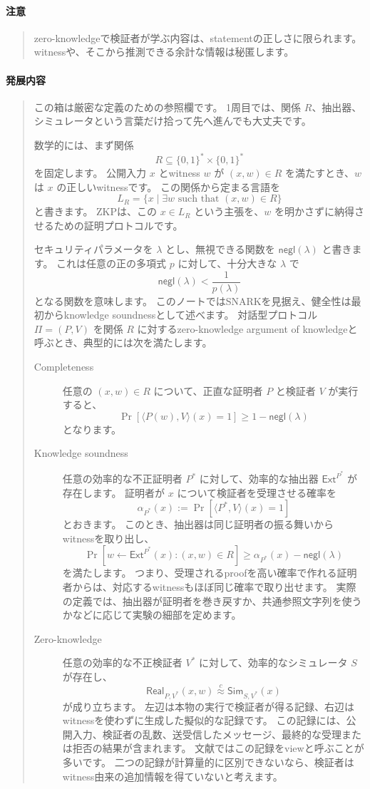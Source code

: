 \documentclass[a4paper,11pt]{ltjsarticle}
\newcommand{\Ext}{\mathsf{Ext}}
\newcommand{\negl}{\mathsf{negl}}
\newenvironment{warnbox}{%
  \paragraph*{注意}\begin{quote}
}{%
  \end{quote}
}
\newenvironment{advancedbox}{%
  \paragraph*{発展内容}\begin{quote}
}{%
  \end{quote}
}
\begin{document}
\begin{warnbox}
zero-knowledgeで検証者が学ぶ内容は、statementの正しさに限られます。
witnessや、そこから推測できる余計な情報は秘匿します。
\end{warnbox}

\begin{advancedbox}
この箱は厳密な定義のための参照欄です。
1周目では、関係 \(R\)、抽出器、シミュレータという言葉だけ拾って先へ進んでも大丈夫です。

数学的には、まず関係
\[
  R \subseteq \{0,1\}^\ast \times \{0,1\}^\ast
\]
を固定します。
公開入力 \(x\) とwitness \(w\) が \((x,w)\in R\) を満たすとき、\(w\) は \(x\) の正しいwitnessです。
この関係から定まる言語を
\[
  L_R=\{x\mid \exists w \text{ such that } (x,w)\in R\}
\]
と書きます。
ZKPは、この \(x\in L_R\) という主張を、\(w\) を明かさずに納得させるための証明プロトコルです。

セキュリティパラメータを \(\lambda\) とし、無視できる関数を \(\negl(\lambda)\) と書きます。
これは任意の正の多項式 \(p\) に対して、十分大きな \(\lambda\) で
\[
  \negl(\lambda) < \frac{1}{p(\lambda)}
\]
となる関数を意味します。
このノートではSNARKを見据え、健全性は最初からknowledge soundnessとして述べます。
対話型プロトコル \(\Pi=(P,V)\) を関係 \(R\) に対するzero-knowledge argument of knowledgeと呼ぶとき、典型的には次を満たします。

\begin{description}
  \item[Completeness]
  任意の \((x,w)\in R\) について、正直な証明者 \(P\) と検証者 \(V\) が実行すると、
  \[
    \Pr[\langle P(w),V\rangle(x)=1]\ge 1-\negl(\lambda)
  \]
  となります。

  \item[Knowledge soundness]
  任意の効率的な不正証明者 \(P^\ast\) に対して、効率的な抽出器 \(\Ext^{P^\ast}\) が存在します。
  証明者が \(x\) について検証者を受理させる確率を
  \[
    \alpha_{P^\ast}(x)
    :=
    \Pr[\langle P^\ast,V\rangle(x)=1]
  \]
  とおきます。
  このとき、抽出器は同じ証明者の振る舞いからwitnessを取り出し、
  \[
    \Pr[
      w\leftarrow \Ext^{P^\ast}(x) : (x,w)\in R
    ]
    \ge
    \alpha_{P^\ast}(x)-\negl(\lambda)
  \]
  を満たします。
  つまり、受理されるproofを高い確率で作れる証明者からは、対応するwitnessもほぼ同じ確率で取り出せます。
  実際の定義では、抽出器が証明者を巻き戻すか、共通参照文字列を使うかなどに応じて実験の細部を定めます。

  \item[Zero-knowledge]
  任意の効率的な不正検証者 \(V^\ast\) に対して、効率的なシミュレータ \(S\) が存在し、
  \[
    \mathsf{Real}_{P,V^\ast}(x,w) \stackrel{c}{\approx}
    \mathsf{Sim}_{S,V^\ast}(x)
  \]
  が成り立ちます。
  左辺は本物の実行で検証者が得る記録、右辺はwitnessを使わずに生成した擬似的な記録です。
  この記録には、公開入力、検証者の乱数、送受信したメッセージ、最終的な受理または拒否の結果が含まれます。
  文献ではこの記録をviewと呼ぶことが多いです。
  二つの記録が計算量的に区別できないなら、検証者はwitness由来の追加情報を得ていないと考えます。
\end{description}


\end{advancedbox}
\end{document}
